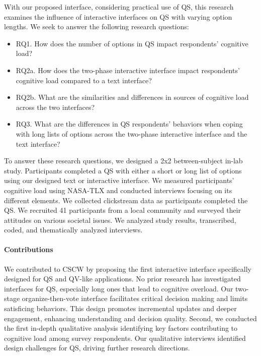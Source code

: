 With our proposed interface, considering practical use of QS, this research examines the influence of interactive interfaces on QS with varying option lengths. We seek to answer the following research questions:

\begin{itemize}
    \item RQ1. How does the number of options in QS impact respondents' cognitive load?
    \item RQ2a. How does the two-phase interactive interface impact respondents' cognitive load compared to a text interface?
    \item RQ2b. What are the similarities and differences in sources of cognitive load across the two interfaces?
    \item RQ3. What are the differences in QS respondents' behaviors when coping with long lists of options across the two-phase interactive interface and the text interface?
\end{itemize}

To answer these research questions, we designed a 2x2 between-subject in-lab study. Participants completed a QS with either a short or long list of options using our designed text or interactive interface. We measured participants' cognitive load using NASA-TLX and conducted interviews focusing on its different elements. We collected clickstream data as participants completed the QS. We recruited 41 participants from a local community and surveyed their attitudes on various societal issues. We analyzed study results, transcribed, coded, and thematically analyzed interviews.

\paragraph{Contributions}
We contributed to CSCW by proposing the first interactive interface specifically designed for QS and QV-like applications. No prior research has investigated interfaces for QS, especially long ones that lead to cognitive overload. Our two-stage organize-then-vote interface facilitates critical decision making and limits satisficing behaviors. This design promotes incremental updates and deeper engagement, enhancing understanding and decision quality. Second, we conducted the first in-depth qualitative analysis identifying key factors contributing to cognitive load among survey respondents. Our qualitative interviews identified design challenges for QS, driving further research directions.


